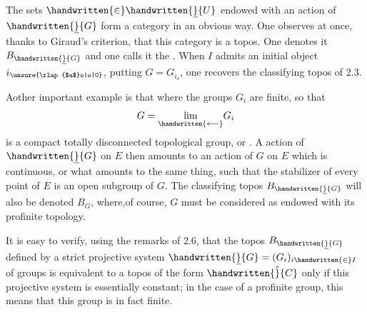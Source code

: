 The sets $\handwritten{\in}\handwritten{\underline}{U}$ endowed with an action of $\handwritten{\underline}{G}$ form a category in an obvious way. One observes at once, thanks to Giraud's criterion, that this category is a topos. One denotes it $B_{\handwritten{\underline}{G}}$ and one calls it the . When $I$ admits an  initial object $i_{\unsure{\rlap{$a$}o|o|0}}$, putting $G=G_{i_o}$, one recovers the classifying topos of 2.3.

 Aother important example is that where the groups $G_i$ are finite, so that
\[
G=\underset{\handwritten{\longleftarrow}}{\lim}G_i
\]
is a compact totally disconnected topological group, or . A action of $\handwritten{\underline}{G}$ on $E$ then amounts to an action of $G$ on $E$ which is continuous, or what amounts to the same thing, such that the stabilizer of every point of $E$ is an open subgroup of $G$. The classifying topos $B_{\handwritten{\underline}{G}}$ will also be denoted $B_G$, where,of course, $G$ must be considered as endowed with its profinite topology.

 It is easy to verify, using the remarks of 2.6, that the topos $B_{\handwritten{\underline}{G}}$ defined by a strict projective system  $\handwritten{\underline}{G}=(G_i)_{i\handwritten{\in}I}$ of groups is equivalent to a topos of the form $\handwritten{\hat}{C}$ only if this projective system is essentially constant; in the case of a profinite group, this means that this group is in fact finite.
